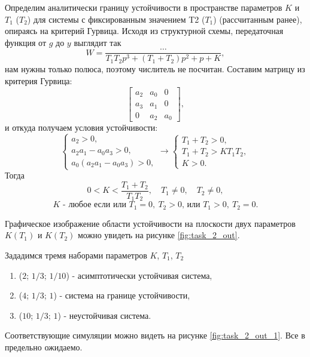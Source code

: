 Определим аналитически границу устойчивости в пространстве параметров $K$ и $T_1$ ($T_2$)
для системы с фиксированным значением T2 ($T_1$) (рассчитанным ранее), 
опираясь на критерий Гурвица. Исходя из структурной схемы, передаточная функция от 
$g$ до $y$ выглядит так
\begin{equation*}
    W=\frac{\dots}{T_1T_2p^3+(T_1+T_2)p^2+p+K},
\end{equation*}
нам нужны только полюса, поэтому числитель не посчитан. Составим матрицу из критерия
Гурвица:
\begin{equation*}
    \begin{bmatrix}
        a_2&a_0&0\\a_3&a_1&0\\0&a_2&a_0
    \end{bmatrix},
\end{equation*}
и откуда получаем условия устойчивости:
\begin{equation*}
    \begin{cases}
        a_2>0,\\
        a_2a_1-a_0a_3>0,\\
        a_0(a_2a_1-a_0a_3)>0,
    \end{cases}\rightarrow
    \begin{cases}
        T_1+T_2>0,\\
        T_1+T_2>KT_1T_2,\\
        K>0.
    \end{cases}
\end{equation*}
Тогда 
\begin{equation*}
    0<K<\frac{T_1+T_2}{T_1T_2},\quad T_1\neq 0, \quad T_2\neq 0,
\end{equation*}
\begin{equation*}
    \text{$K$ - любое если или $T_1=0,\: T_2>0$, или $T_1>0,\: T_2=0$}.
\end{equation*}

Графическое изображение области устойчивости на плоскости
двух параметров $K(T_1)$ и $K(T_2)$ можно увидеть на рисунке \ref{fig:task_2_out}.

Зададимся тремя наборами параметров $K$, $T_1$, $T_2$
\begin{enumerate}
    \item ($2$; $1/3$; $1/10$) - асимптотически устойчивая система,
    \item ($4$; $1/3$; $1$) - система на границе устойчивости,
    \item ($10$; $1/3$; $1$) - неустойчивая система.
\end{enumerate}
Соответствующие симуляции можно видеть на рисунке \ref{fig:task_2_out_1}. Все
в предельно ожидаемо.

